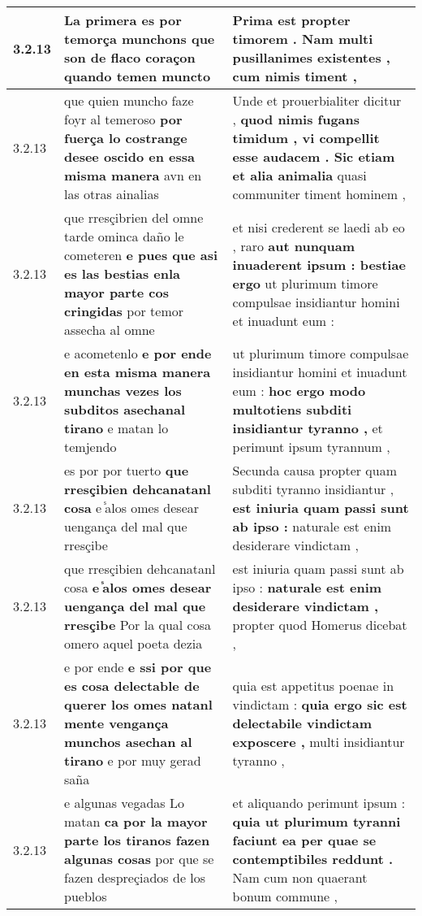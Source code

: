 \begin{tabular}{|p{1cm}|p{6.5cm}|p{6.5cm}|}
3.2.13 & La primera es por temorça munchons \textbf{ que son de flaco coraçon } quando temen muncto & Prima est propter timorem . \textbf{ Nam multi pusillanimes existentes , } cum nimis timent , \\\hline
3.2.13 & que quien muncho faze foyr al temeroso \textbf{ por fuerça lo costrange desee oscido en essa misma manera } avn en las otras ainalias & Unde et prouerbialiter dicitur , \textbf{ quod nimis fugans timidum , vi compellit esse audacem . Sic etiam et alia animalia } quasi communiter timent hominem , \\\hline
3.2.13 & que rresçibrien del omne tarde ominca daño le cometeren \textbf{ e pues que asi es las bestias enla mayor parte cos cringidas } por temor assecha al omne & et nisi crederent se laedi ab eo , raro \textbf{ aut nunquam inuaderent ipsum : bestiae ergo } ut plurimum timore compulsae insidiantur homini et inuadunt eum : \\\hline
3.2.13 & e acometenlo \textbf{ e por ende en esta misma manera munchas vezes los subditos asechanal tirano } e matan lo temjendo & ut plurimum timore compulsae insidiantur homini et inuadunt eum : \textbf{ hoc ergo modo multotiens subditi insidiantur tyranno , } et perimunt ipsum tyrannum , \\\hline
3.2.13 & es por por tuerto \textbf{ que rresçibien dehcanatanl cosa } e ᷤalos omes desear uengança del mal que rresçibe & Secunda causa propter quam subditi tyranno insidiantur , \textbf{ est iniuria quam passi sunt ab ipso : } naturale est enim desiderare vindictam , \\\hline
3.2.13 & que rresçibien dehcanatanl cosa \textbf{ e ᷤalos omes desear uengança del mal que rresçibe } Por la qual cosa omero aquel poeta dezia & est iniuria quam passi sunt ab ipso : \textbf{ naturale est enim desiderare vindictam , } propter quod Homerus dicebat , \\\hline
3.2.13 & e por ende \textbf{ e ssi por que es cosa delectable de querer los omes natanl mente vengança munchos asechan al tirano } e por muy gerad saña & quia est appetitus poenae in vindictam : \textbf{ quia ergo sic est delectabile vindictam exposcere , } multi insidiantur tyranno , \\\hline
3.2.13 & e algunas vegadas Lo matan \textbf{ ca por la mayor parte los tiranos fazen algunas cosas } por que se fazen despreçiados de los pueblos & et aliquando perimunt ipsum : \textbf{ quia ut plurimum tyranni faciunt ea per quae se contemptibiles reddunt . } Nam cum non quaerant bonum commune , \\\hline

\end{tabular}
